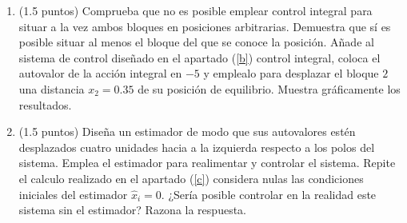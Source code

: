 \documentclass[10pt,a4paper]{article}
\begin{document}
\begin{enumerate}
\begin{enumerate}
\item \label{c} (1.5 puntos) Comprueba que no es posible emplear control integral para situar a la vez ambos bloques en posiciones arbitrarias. Demuestra que sí es posible situar al menos el bloque del que se conoce  la posición. Añade al sistema de control diseñado en el apartado (\ref{b}) control integral, coloca el autovalor de la acción integral en $-5$ y emplealo para desplazar el bloque $2$ una distancia $x_2 = 0.35$ de su posición de equilibrio. Muestra gráficamente los resultados.


\item (1.5 puntos) Diseña un estimador de modo que sus autovalores estén desplazados cuatro unidades hacia a la izquierda respecto a los polos del sistema. Emplea el estimador para realimentar y controlar el sistema. Repite el calculo realizado en el apartado (\ref{c}) considera nulas las condiciones iniciales del estimador $\hat{x}_i=0$. ¿Sería posible controlar en la realidad este sistema sin el estimador? Razona la respuesta.

\end{enumerate}
\end{enumerate}
\end{document}
